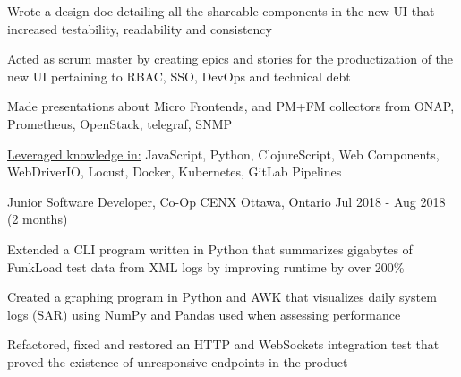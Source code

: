 \begin{cventries}
{\begin{cvitems}
			\item{Wrote a design doc detailing all the shareable components in the new UI that increased testability, readability and consistency}
			\item{Acted as scrum master by creating epics and stories for the productization of the new UI pertaining to RBAC, SSO, DevOps and technical debt}
			\item{Made presentations about Micro Frontends, and PM+FM collectors from ONAP, Prometheus, OpenStack, telegraf, SNMP}
			\item{\underline{Leveraged knowledge in:} JavaScript, Python, ClojureScript, Web Components, WebDriverIO, Locust, Docker, Kubernetes, GitLab Pipelines}
		\end{cvitems}
	}
	\cventry
	{Junior Software Developer, Co-Op}
	{CENX}
	{Ottawa, Ontario}
	{Jul 2018 - Aug 2018 (2 months)}
	{
		\begin{cvitems}
			\item{Extended a CLI program written in Python that summarizes gigabytes of FunkLoad test data from XML logs by improving runtime by over 200\%}
			\item{Created a graphing program in Python and AWK that visualizes daily system logs (SAR) using NumPy and Pandas used when assessing performance}
			\item{Refactored, fixed and restored an HTTP and WebSockets integration test that proved the existence of unresponsive endpoints in the product}
		\end{cvitems}
	}
\end{cventries}
